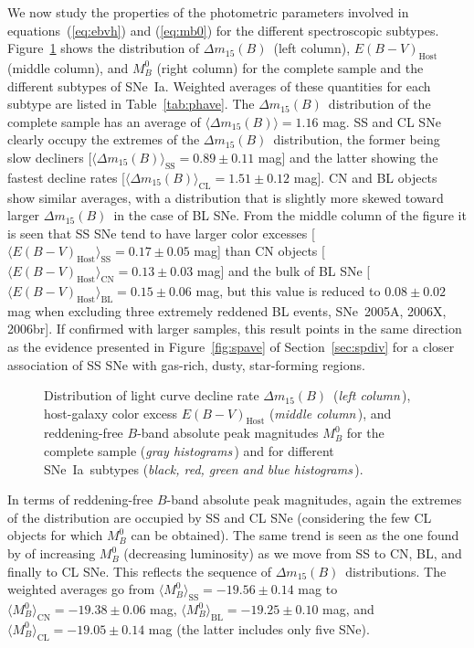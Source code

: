 \documentclass[apj]{emulateapj-rtx4}
\newcommand{\dm}{$\Delta m_{15}(B)$}
\newcommand{\sneia}{SNe~Ia}
\begin{document}
We now study the properties of the photometric parameters
involved in equations~(\ref{eq:ebvh}) and (\ref{eq:mb0}) for the 
different spectroscopic subtypes. Figure~\ref{fig:dmebvhist} shows
the distribution of \dm\ (left 
column), $E(B-V)_{\mathrm{Host}}$ (middle column), and $M_B^0$ (right
column) for the complete sample and the different subtypes of 
\sneia. Weighted averages of these quantities for each subtype
are listed in Table~\ref{tab:phave}. The \dm\ distribution of the
complete sample has an average of $\langle$\dm$\rangle=1.16$ mag. SS
and CL SNe clearly occupy the extremes of the \dm\ distribution, the
former being slow decliners
[$\langle$\dm$\rangle_{\mathrm{SS}}=0.89\pm 0.11$ mag] and the latter 
showing the fastest decline rates
[$\langle$\dm$\rangle_{\mathrm{CL}}=1.51 \pm 0.12$ mag]. CN and BL
objects show similar averages, with a distribution 
that is slightly more skewed toward larger \dm\ in the case of BL SNe. 
From the middle column of the figure it is seen that SS SNe tend
to have larger color excesses [$\langle
E(B-V)_{\mathrm{Host}}\rangle_{\mathrm{SS}}=0.17 \pm 0.05$ mag] than
CN objects [$\langle E(B-V)_{\mathrm{Host}}\rangle_{\mathrm{CN}}=0.13
  \pm 0.03$ mag] and the bulk of BL SNe [$\langle
  E(B-V)_{\mathrm{Host}}\rangle_{\mathrm{BL}}=0.15 \pm 0.06$ mag, but 
this value is reduced to $0.08 \pm 0.02$ mag when excluding three
extremely reddened BL events, SNe~2005A, 2006X, 2006br]. If confirmed
with larger samples, this result points in the same direction as the
evidence presented in Figure~\ref{fig:spave} of Section~\ref{sec:spdiv} 
for a closer association of SS SNe with gas-rich, dusty, star-forming
regions.

\begin{figure}[htpb]%
\caption{Distribution of light curve decline rate \dm\ ({\em left
    column\,}), host-galaxy color excess $E(B-V)_{\mathrm{Host}}$
  ({\em middle column\,}), and reddening-free $B$-band absolute peak
  magnitudes $M_B^0$ for the complete sample ({\em gray histograms\,})
  and for different \sneia\ subtypes ({\em black, red, green and blue
    histograms\,}).\label{fig:dmebvhist}}  
\end{figure}

In terms of reddening-free $B$-band absolute peak magnitudes, again
the extremes of the distribution are occupied by SS
and CL SNe (considering the few CL objects for which $M_B^0$ can be
obtained). The same trend is seen as the one found by
\citet{blondin12} of increasing $M_B^0$ (decreasing luminosity) as we
move from SS to CN, BL, and finally to CL SNe. This reflects the sequence of
\dm\ distributions. The weighted averages go from 
$\langle M_B^0 \rangle_{\mathrm{SS}}=-19.56 \pm 0.14$ mag to
$\langle M_B^0 \rangle_{\mathrm{CN}}=-19.38 \pm 0.06$ mag, $\langle
M_B^0 \rangle_{\mathrm{BL}}=-19.25 \pm 0.10$ mag, and $\langle M_B^0
\rangle_{\mathrm{CL}}=-19.05 \pm 0.14$ mag (the latter includes only
five SNe).
\end{document}
